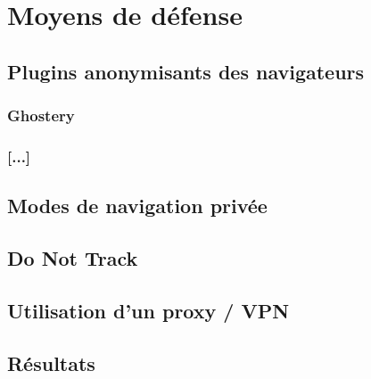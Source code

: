 \chapter{Moyens de défense}
	\section{Plugins anonymisants des navigateurs}
		\subsection{Ghostery}
		\subsection{[...]}
		
	\section{Modes de navigation privée}
		
	\section{Do Not Track}
		
	\section{Utilisation d'un proxy / VPN}
		
	\section{Résultats}
		
